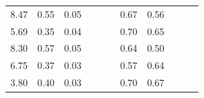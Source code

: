 \documentclass[10pt,a4paper]{article}
\begin{document}
\begin{table}
\begin{tabular}{@{}ccccccccccc@{}}
		8.47                                                         & 0.55                                                & 0.05                                                &                                                     &                                                     &                                                      & 0.67                                                & 0.56                                                  &                                                         &                                                      & \cite{ADAS}            \\
		5.69                                                         & 0.35                                                & 0.04                                                &                                                     &                                                     &                                                      & 0.70                                                & 0.65                                                  &                                                         &                                                      & \cite{ADAS}            \\
		8.30                                                         & 0.57                                                & 0.05                                                &                                                     &                                                     &                                                      & 0.64                                                & 0.50                                                  &                                                         &                                                      & \cite{ADAS}            \\
		6.75                                                         & 0.37                                                & 0.03                                                &                                                     &                                                     &                                                      & 0.57                                                & 0.64                                                  &                                                         &                                                      & \cite{ADAS}           \\
		3.80                                                         & 0.40                                                & 0.03                                                &                                                     &                                                     &                                                      & 0.70                                                & 0.67                                                  &                                                         &                                                      & \cite{ADAS}            \\

\end{tabular}
\end{table}
\end{document}
